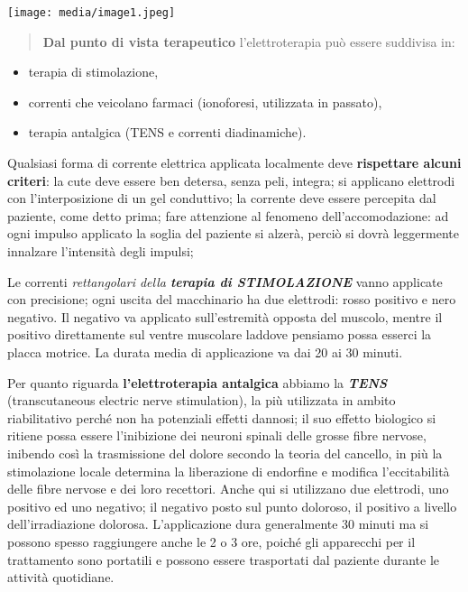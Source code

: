 \documentclass[]{article}
\begin{document}
\texttt{[image: media/image1.jpeg]}

\begin{quote}
\textbf{Dal punto di vista terapeutico} l'elettroterapia può essere
suddivisa in:
\end{quote}

\begin{itemize}
\item
  terapia di stimolazione,
\item
  correnti che veicolano farmaci (ionoforesi, utilizzata in passato),
\item
  terapia antalgica (TENS e correnti diadinamiche).
\end{itemize}

Qualsiasi forma di corrente elettrica applicata localmente deve
\textbf{rispettare alcuni criteri}: la cute deve essere ben detersa,
senza peli, integra; si applicano elettrodi con l'interposizione di un
gel conduttivo; la corrente deve essere percepita dal paziente, come
detto prima; fare attenzione al fenomeno dell'accomodazione: ad ogni
impulso applicato la soglia del paziente si alzerà, perciò si dovrà
leggermente innalzare l'intensità degli impulsi;

Le correnti \emph{rettangolari della \textbf{terapia di STIMOLAZIONE
}}vanno applicate con precisione; ogni uscita del macchinario ha due
elettrodi: rosso positivo e nero negativo. Il negativo va applicato
sull'estremità opposta del muscolo, mentre il positivo direttamente sul
ventre muscolare laddove pensiamo possa esserci la placca motrice. La
durata media di applicazione va dai 20 ai 30 minuti.

Per quanto riguarda \textbf{l'elettroterapia antalgica} abbiamo la
\textbf{\emph{TENS}} (transcutaneous electric nerve stimulation), la più
utilizzata in ambito riabilitativo perché non ha potenziali effetti
dannosi; il suo effetto biologico si ritiene possa essere l'inibizione
dei neuroni spinali delle grosse fibre nervose, inibendo così la
trasmissione del dolore secondo la teoria del cancello, in più la
stimolazione locale determina la liberazione di endorfine e modifica
l'eccitabilità delle fibre nervose e dei loro recettori. Anche qui si
utilizzano due elettrodi, uno positivo ed uno negativo; il negativo
posto sul punto doloroso, il positivo a livello dell'irradiazione
dolorosa. L'applicazione dura generalmente 30 minuti ma si possono
spesso raggiungere anche le 2 o 3 ore, poiché gli apparecchi per il
trattamento sono portatili e possono essere trasportati dal paziente
durante le attività quotidiane.
\end{document}
